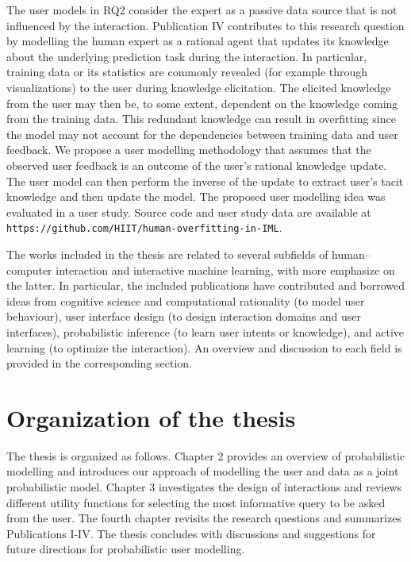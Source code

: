 \documentclass[dissertation,math,vertlayout,pdfa,colorlinks]{aaltoseries}
\begin{document}
The user models in RQ2 consider the expert as a passive data source that is not influenced by the interaction. Publication IV contributes to this research question by modelling the human expert as a rational agent that updates its knowledge about the underlying prediction task during the interaction. In particular, training data or its statistics are commonly revealed (for example through visualizations) to the user during knowledge elicitation. The elicited knowledge from the user may then be, to some extent, dependent on the knowledge coming from the training data. This redundant knowledge can  result in overfitting since the model may not account for the dependencies between training data and user feedback. We propose a user modelling methodology that assumes that the observed user feedback is an outcome of the user's rational knowledge update. The user model can then perform the inverse of the update to extract user's tacit knowledge and then update the model. The proposed user modelling idea was evaluated in a user study. 
Source code and user study data are available at \texttt{https://github.com/HIIT/human-overfitting-in-IML}.


The works included in the thesis are related to several subfields of human--computer interaction and interactive machine learning, with more emphasize on the latter. In particular, the included publications have contributed and borrowed ideas from cognitive science and computational rationality (to model user behaviour), user interface design (to design interaction domains and user interfaces), probabilistic inference (to learn user intents or knowledge), and active learning (to optimize the interaction). An overview and discussion to each field is provided in the corresponding section.

\section{Organization of the thesis}

The thesis is organized as follows. Chapter 2 provides an overview of probabilistic modelling and introduces our approach of modelling the user and data as a joint probabilistic model. Chapter 3 investigates the design of interactions and reviews different utility functions for selecting the most informative query to be asked from the user. The fourth chapter revisits the research questions and summarizes Publications I-IV. The thesis concludes with discussions and suggestions for future directions for probabilistic user modelling.
\end{document}
